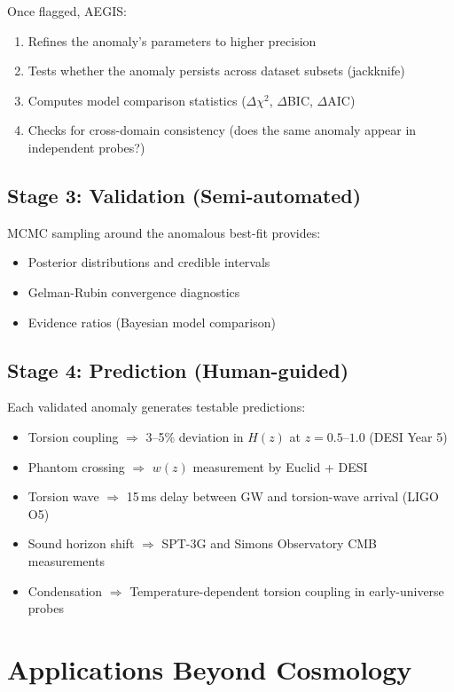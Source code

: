 \documentclass[twocolumn,showpacs,preprintnumbers,amsmath,amssymb,prl]{revtex4-2}
\begin{document}
Once flagged, AEGIS:
\begin{enumerate}
\item Refines the anomaly's parameters to higher precision
\item Tests whether the anomaly persists across dataset subsets (jackknife)
\item Computes model comparison statistics ($\Delta\chi^2$, $\Delta$BIC, $\Delta$AIC)
\item Checks for cross-domain consistency (does the same anomaly appear in independent probes?)
\end{enumerate}

\subsection{Stage 3: Validation (Semi-automated)}

MCMC sampling around the anomalous best-fit provides:
\begin{itemize}
\item Posterior distributions and credible intervals
\item Gelman-Rubin convergence diagnostics
\item Evidence ratios (Bayesian model comparison)
\end{itemize}

\subsection{Stage 4: Prediction (Human-guided)}

Each validated anomaly generates testable predictions:
\begin{itemize}
\item Torsion coupling $\Rightarrow$ 3--5\% deviation in $H(z)$ at $z = 0.5$--$1.0$ (DESI Year 5)
\item Phantom crossing $\Rightarrow$ $w(z)$ measurement by Euclid + DESI
\item Torsion wave $\Rightarrow$ 15\,ms delay between GW and torsion-wave arrival (LIGO O5)
\item Sound horizon shift $\Rightarrow$ SPT-3G and Simons Observatory CMB measurements
\item Condensation $\Rightarrow$ Temperature-dependent torsion coupling in early-universe probes
\end{itemize}

\section{Applications Beyond Cosmology}
\end{document}
